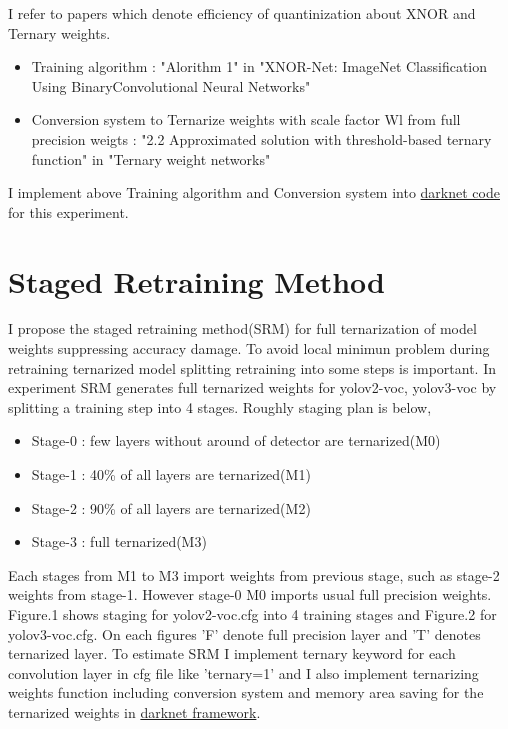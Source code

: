 \documentclass[10pt,a4paper,twocolumn]{article}
\begin{document}
I refer to papers which denote efficiency of quantinization about XNOR and Ternary weights.
\begin{itemize}
\item
 Training algorithm : "Alorithm 1" in "XNOR-Net: ImageNet Classification Using BinaryConvolutional Neural Networks"\cite{Rastegari2015XNORNetIC}
\item
 Conversion system to Ternarize weights with scale factor Wl from full precision weigts : "2.2 Approximated solution with threshold-based ternary function" in "Ternary weight networks"\cite{Li2016TernaryWN}
\end{itemize}

I implement above Training algorithm and Conversion system into \href{https://github.com/pjreddie/darknet}{darknet code} for this experiment.

\section{Staged Retraining Method}

I propose the staged retraining method(SRM) for full ternarization of model weights suppressing accuracy damage.
To avoid local minimun problem during retraining ternarized model splitting retraining into some steps is important.
In experiment SRM generates full ternarized weights for yolov2-voc\cite{redmon2016yolo9000}, yolov3-voc\cite{yolov3} by splitting a training step into 4 stages.
Roughly staging plan is below,

\begin{itemize}
\item Stage-0 : few layers without around of detector are ternarized(M0)
\item Stage-1 : 40\% of all layers are ternarized(M1)
\item Stage-2 : 90\% of all layers are ternarized(M2)
\item Stage-3 : full ternarized(M3)
\end{itemize}

Each stages from M1 to M3 import weights from previous stage, such as stage-2 weights from stage-1.
However stage-0 M0 imports usual full precision weights.
Figure.1 shows staging for yolov2-voc.cfg into 4 training stages and Figure.2 for yolov3-voc.cfg.
On each figures 'F' denote full precision layer and 'T' denotes ternarized layer.
To estimate SRM I implement ternary keyword for each convolution layer in cfg file like 'ternary=1' and I also implement ternarizing weights function including conversion system\cite{Li2016TernaryWN} and memory area saving for the ternarized weights in \href{https://pjreddie.com/darknet/yolo}{darknet framework}.
\end{document}

